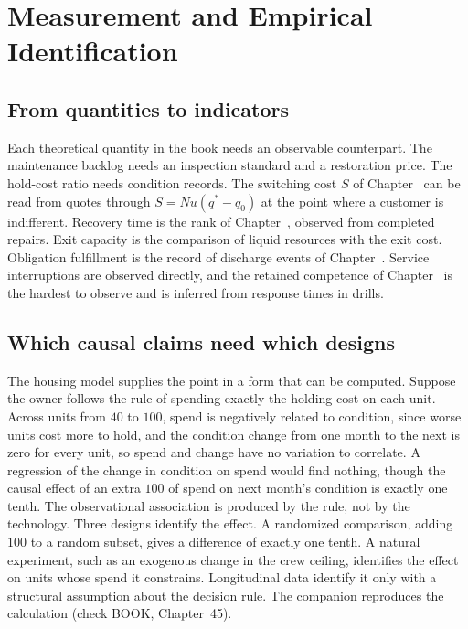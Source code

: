 \chapter{Measurement and Empirical Identification}\label{ch:45}

\section{From quantities to indicators}

Each theoretical quantity in the book needs an observable counterpart. The maintenance backlog needs an inspection standard and a restoration price. The hold-cost ratio needs condition records. The switching cost $S$ of Chapter~ can be read from quotes through $S=Nu(q^*-q_0)$ at the point where a customer is indifferent. Recovery time is the rank of Chapter~, observed from completed repairs. Exit capacity is the comparison of liquid resources with the exit cost. Obligation fulfillment is the record of discharge events of Chapter~. Service interruptions are observed directly, and the retained competence of Chapter~ is the hardest to observe and is inferred from response times in drills.

\section{Which causal claims need which designs}

The housing model supplies the point in a form that can be computed. Suppose the owner follows the rule of spending exactly the holding cost on each unit. Across units from $40$ to $100$, spend is negatively related to condition, since worse units cost more to hold, and the condition change from one month to the next is zero for every unit, so spend and change have no variation to correlate. A regression of the change in condition on spend would find nothing, though the causal effect of an extra $100$ of spend on next month's condition is exactly one tenth. The observational association is produced by the rule, not by the technology. Three designs identify the effect. A randomized comparison, adding $100$ to a random subset, gives a difference of exactly one tenth. A natural experiment, such as an exogenous change in the crew ceiling, identifies the effect on units whose spend it constrains. Longitudinal data identify it only with a structural assumption about the decision rule. The companion reproduces the calculation (check BOOK, Chapter~45).

